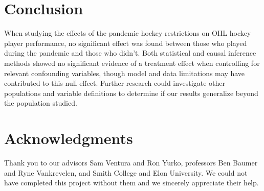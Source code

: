 \documentclass[12pt]{article}
\begin{document}
\hypertarget{conclusion}{%
\section{Conclusion}\label{conclusion}}

When studying the effects of the pandemic hockey restrictions on OHL
hockey player performance, no significant effect was found between those
who played during the pandemic and those who didn't. Both statistical
and causal inference methods showed no significant evidence of a
treatment effect when controlling for relevant confounding variables,
though model and data limitations may have contributed to this null
effect. Further research could investigate other populations and
variable definitions to determine if our results generalize beyond the
population studied.

\hypertarget{acknowledgments}{%
\section{Acknowledgments}\label{acknowledgments}}

Thank you to our advisors Sam Ventura and Ron Yurko, professors Ben
Baumer and Ryne Vankrevelen, and Smith College and Elon University. We
could not have completed this project without them and we sincerely
appreciate their help.

\pagebreak



\end{document}
